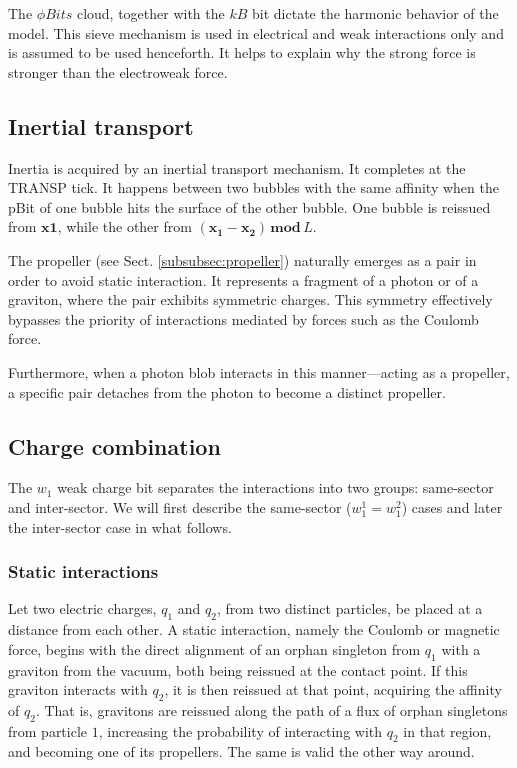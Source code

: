 \documentclass[12pt,english]{article}
\begin{document}
The $\phi Bits$ cloud, together with the $kB$ bit dictate the harmonic behavior of the model. This sieve mechanism is used in electrical and weak interactions only and is assumed to be used henceforth. It helps to explain why the strong force is stronger than the electroweak force.

\subsection{Inertial transport} \label{subsec:inertial-transport}

Inertia is acquired by an inertial transport mechanism. It completes at the TRANSP tick. It happens between two bubbles with the same affinity when the pBit of one bubble hits the surface of the other bubble. One bubble is reissued from $\boldsymbol{x1}$, while the other from $(\boldsymbol{x_1}-\boldsymbol{x_2})\,\boldsymbol{mod}\,L$.

The propeller (see Sect. \ref{subsubsec:propeller}) naturally emerges as a pair in order to avoid static interaction. It represents a fragment of a photon or of a graviton, where the pair exhibits symmetric charges. This symmetry effectively bypasses the priority of interactions mediated by forces such as the Coulomb force. 

Furthermore, when a photon blob interacts in this manner—acting as a propeller, a specific pair detaches from the photon to become a distinct propeller.

\subsection{Charge combination}

The $w_{1}$ weak charge bit separates the interactions into two groups:
same-sector and inter-sector. We will first describe the same-sector ($w_{1}^{1}=w_{1}^{2}$) cases and later the inter-sector case in what follows.

\subsubsection{Static interactions}

Let two electric charges, $q_1$ and $q_2$, from two distinct particles, be placed at a distance from each other. A static interaction, namely the Coulomb or magnetic force, begins with the direct alignment of an orphan singleton from $q_1$ with a graviton from the vacuum, both being reissued at the contact point. If this graviton interacts with $q_2$, it is then reissued at that point, acquiring the affinity of $q_2$. That is, gravitons are reissued along the path of a flux of orphan singletons from particle $1$, increasing the probability of interacting with $q_2$ in that region, and becoming one of its propellers. The same is valid the other way around.
\end{document}
